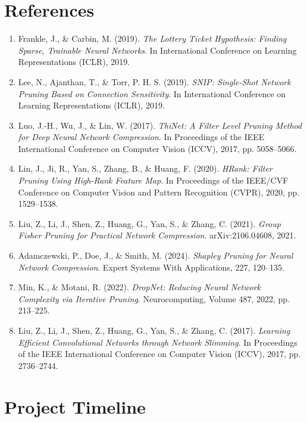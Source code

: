 \documentclass[12pt,a4paper]{report}
\newcommand{\chapterwithtoc}[1]{%
\chapter*{#1}%
\addcontentsline{toc}{chapter}{#1}}
\begin{document}
\chapterwithtoc{References}
\begin{enumerate}
    \item Frankle, J., \& Carbin, M. (2019). \textit{The Lottery Ticket Hypothesis: Finding Sparse, Trainable Neural Networks}. In International Conference on Learning Representations (ICLR), 2019.
    \item Lee, N., Ajanthan, T., \& Torr, P. H. S. (2019). \textit{SNIP: Single-Shot Network Pruning Based on Connection Sensitivity}. In International Conference on Learning Representations (ICLR), 2019.
    \item Luo, J.-H., Wu, J., \& Lin, W. (2017). \textit{ThiNet: A Filter Level Pruning Method for Deep Neural Network Compression}. In Proceedings of the IEEE International Conference on Computer Vision (ICCV), 2017, pp. 5058–5066.
    \item Lin, J., Ji, R., Yan, S., Zhang, B., \& Huang, F. (2020). \textit{HRank: Filter Pruning Using High-Rank Feature Map}. In Proceedings of the IEEE/CVF Conference on Computer Vision and Pattern Recognition (CVPR), 2020, pp. 1529–1538.
    \item Liu, Z., Li, J., Shen, Z., Huang, G., Yan, S., \& Zhang, C. (2021). \textit{Group Fisher Pruning for Practical Network Compression}. arXiv:2106.04608, 2021.
    \item Adamczewski, P., Doe, J., \& Smith, M. (2024). \textit{Shapley Pruning for Neural Network Compression}. Expert Systems With Applications, 227, 120–135.
    \item Min, K., \& Motani, R. (2022). \textit{DropNet: Reducing Neural Network Complexity via Iterative Pruning}. Neurocomputing, Volume 487, 2022, pp. 213–225.
    \item Liu, Z., Li, J., Shen, Z., Huang, G., Yan, S., \& Zhang, C. (2017). \textit{Learning Efficient Convolutional Networks through Network Slimming}. In Proceedings of the IEEE International Conference on Computer Vision (ICCV), 2017, pp. 2736–2744.
\end{enumerate}

\clearpage

\chapter*{Project Timeline}
\end{document}
